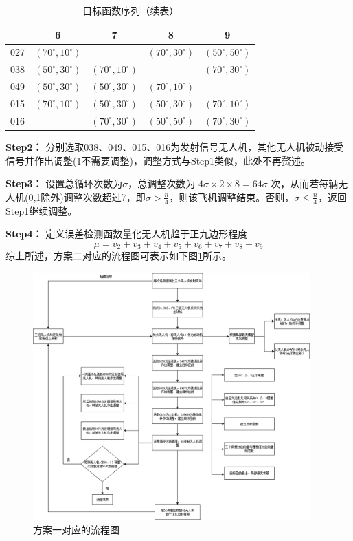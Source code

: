\documentclass[withoutpreface,bwprint]{cumcmthesis} %
\begin{document}
\begin{enumerate}
\begin{table}[htbp]
  \centering
  \caption{目标函数序列（续表）}
  \label{表4}
  \begin{tabular}{ccccc}
    \toprule
    & 6 & 7 & 8 & 9 \\
    \midrule
    027 & $(70^\circ, 10^\circ)$ &  & $(70^\circ, 30^\circ)$ & $(50^\circ, 50^\circ)$ \\
    038 & $(50^\circ, 30^\circ)$ & $(70^\circ, 10^\circ)$ &  & $(70^\circ, 30^\circ)$ \\
    049 & $(50^\circ, 30^\circ)$ & $(50^\circ, 30^\circ)$ & $(70^\circ, 10^\circ)$ &  \\
    015 & $(70^\circ, 10^\circ)$ & $(50^\circ, 30^\circ)$ & $(50^\circ, 30^\circ)$ & $(70^\circ, 10^\circ)$ \\
    016 &  & $(70^\circ, 30^\circ)$ & $(50^\circ, 50^\circ)$ & $(70^\circ, 30^\circ)$ \\
    \bottomrule
  \end{tabular}
\end{table}

    \textbf{Step2：} 分别选取038、049、015、016为发射信号无人机，其他无人机被动接受信号并作出调整(1不需要调整)，调整方式与Step1类似，此处不再赘述。

    \textbf{Step3：} 设置总循环次数为$\sigma$，总调整次数为 $4\sigma \times 2 \times 8 = 64\sigma$ 次，从而若每辆无人机(0,1除外)调整次数超过7，即$\sigma>\frac{n}{4}$，则该飞机调整结束。否则，$\sigma \leq\frac{n}{4}$，返回Step1继续调整。


    \textbf{Step4：} 定义误差检测函数量化无人机趋于正九边形程度
\[
\mu = v_2 + v_3 + v_4 + v_5 + v_6 + v_7 + v_8 + v_9
\]
综上所述，方案二对应的流程图可表示如下图\ref{q3_2}所示。

\begin{figure}[H]
    \centering
    \includegraphics[width=0.95\textwidth]{../../figure/q3_2.png} 
    \caption{方案一对应的流程图}
    \label{q3_2}    
\end{figure}



\end{enumerate}
\end{document}
